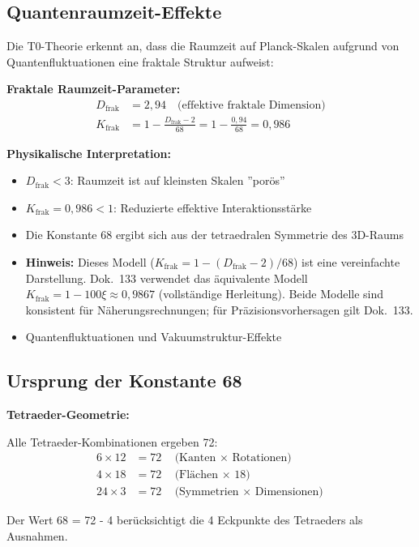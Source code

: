	\subsection{Quantenraumzeit-Effekte}
	
	Die T0-Theorie erkennt an, dass die Raumzeit auf Planck-Skalen aufgrund von Quantenfluktuationen eine fraktale Struktur aufweist:
	
	\begin{keyresult}
		\textbf{Fraktale Raumzeit-Parameter:}
		\begin{align}
			D_{\text{frak}} &= 2{,}94 \quad \text{(effektive fraktale Dimension)} \\
			K_{\text{frak}} &= 1 - \frac{D_{\text{frak}} - 2}{68} = 1 - \frac{0{,}94}{68} = 0{,}986
		\end{align}
		
		\textbf{Physikalische Interpretation:}
		\begin{itemize}
			\item $D_{\text{frak}} < 3$: Raumzeit ist auf kleinsten Skalen ''porös''
			\item $K_{\text{frak}} = 0{,}986 < 1$: Reduzierte effektive Interaktionsstärke
			\item Die Konstante 68 ergibt sich aus der tetraedralen Symmetrie des 3D-Raums
			\item \textbf{Hinweis:} Dieses Modell ($K_{\text{frak}} = 1 - (D_{\text{frak}}-2)/68$) ist eine vereinfachte Darstellung. Dok.~133 verwendet das äquivalente Modell $K_{\text{frak}} = 1 - 100\xi \approx 0{,}9867$ (vollständige Herleitung). Beide Modelle sind konsistent für Näherungsrechnungen; für Präzisionsvorhersagen gilt Dok.~133.
			\item Quantenfluktuationen und Vakuumstruktur-Effekte
		\end{itemize}
	\end{keyresult}
	
	\subsection{Ursprung der Konstante 68}
	
	\begin{alternative}
		\textbf{Tetraeder-Geometrie:}
		
		Alle Tetraeder-Kombinationen ergeben 72:
		\begin{align}
			6 \times 12 &= 72 \quad \text{(Kanten $\times$ Rotationen)} \\
			4 \times 18 &= 72 \quad \text{(Flächen $\times$ 18)} \\
			24 \times 3 &= 72 \quad \text{(Symmetrien $\times$ Dimensionen)}
		\end{align}
		
		Der Wert 68 = 72 - 4 berücksichtigt die 4 Eckpunkte des Tetraeders als Ausnahmen.
	\end{alternative}
	
